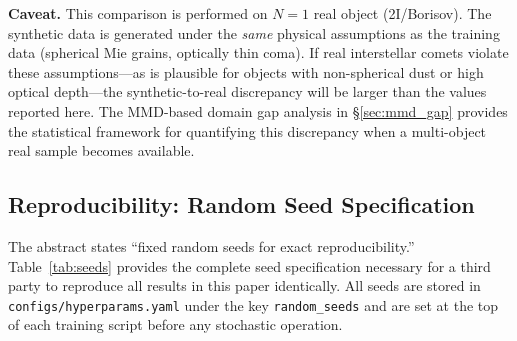 \documentclass[usenatbib]{mnras}
\begin{document}
\textbf{Caveat.} This comparison is performed on $N=1$ real object (2I/Borisov). The synthetic data is generated under the \textit{same} physical assumptions as the training data (spherical Mie grains, optically thin coma). If real interstellar comets violate these assumptions---as is plausible for objects with non-spherical dust or high optical depth---the synthetic-to-real discrepancy will be larger than the values reported here. The MMD-based domain gap analysis in \S\ref{sec:mmd_gap} provides the statistical framework for quantifying this discrepancy when a multi-object real sample becomes available.

\subsection{Reproducibility: Random Seed Specification}\label{app:seeds}

The abstract states ``fixed random seeds for exact reproducibility.'' Table~\ref{tab:seeds} provides the complete seed specification necessary for a third party to reproduce all results in this paper identically. All seeds are stored in \texttt{configs/hyperparams.yaml} under the key \texttt{random\_seeds} and are set at the top of each training script before any stochastic operation.
\end{document}
